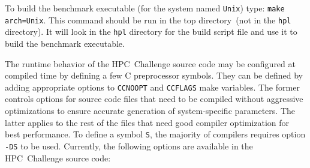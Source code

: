 \documentclass[twocolumn]{article}
\begin{document}
To build the benchmark executable (for the system named \texttt{Unix})
type: \texttt{make arch=Unix}.  This command should be run in the top
directory~(not in the \texttt{hpl} directory). It will look in the
\texttt{hpl} directory for the build script file and use it to build
the benchmark executable.

The runtime behavior of the HPC~Challenge source code may be
configured at compiled time by defining a few C preprocessor
symbols. They can be defined by adding appropriate options to
\texttt{CCNOOPT} and \texttt{CCFLAGS} make variables. The former
controls options for source code files that need to be compiled
without aggressive optimizations to ensure accurate generation of
system-specific parameters. The latter applies to the rest of the
files that need good compiler optimization for best performance. To
define a symbol \texttt{S}, the majority of compilers requires option
\texttt{-DS} to be used. Currently, the following options are
available in the HPC~Challenge source code:
\end{document}
